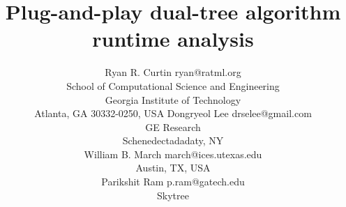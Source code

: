 \documentclass[twoside,11pt]{article} %
\begin{document}
\title{Plug-and-play dual-tree algorithm runtime analysis}

\author{\name Ryan R. Curtin \email ryan@ratml.org\\
  \addr School of Computational Science and Engineering\\
  Georgia Institute of Technology\\
  Atlanta, GA 30332-0250, USA
  \AND
  \name Dongryeol Lee \email drselee@gmail.com\\
  \addr GE Research\\
  Schenedectadadaty, NY\\
  \AND
  \name William B. March \email march@ices.utexas.edu\\
  \addr Austin, TX, USA\\
  \AND
  \name Parikshit Ram \email p.ram@gatech.edu\\
  \addr Skytree
}


\maketitle
\end{document}
